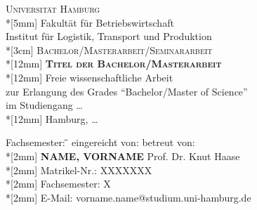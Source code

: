 \documentclass[11pt,a4paper]{article}
\begin{document}
\setcounter{page}{0} %
	\begin{titlepage}
		\begin{center}
			{\LARGE\scshape Universität Hamburg}\\*[5mm]
      		{\normalsize Fakultät für Betriebswirtschaft\\
			Institut für Logistik, Transport und Produktion}\\*[3cm]
      		{\Large\scshape Bachelor/Masterarbeit/Seminararbeit}\\*[12mm]
      		{\bfseries\Large\scshape Titel der Bachelor/Masterarbeit}\\*[12mm] %
      		{\rmfamily Freie wissenschaftliche Arbeit\\
           	zur Erlangung des Grades "`Bachelor/Master of Science"'\\
           	im Studiengang \ldots} \\*[12mm]
      		{\normalsize\rmfamily Hamburg, \ldots} %
		\end{center}
		\vspace{8cm}
		\begin{tabbing}
			Fachsemester: \= \hspace{70mm}\= \kill
 			eingereicht von: \>\> betreut von: \\*[2mm]
      		\textbf{NAME, VORNAME} \>\>  Prof. Dr. Knut Haase\\*[2mm] %
      		Matrikel-Nr.: \> XXXXXXX \>  \\*[2mm] %
      		Fachsemester: \> X \\*[2mm] %
      		E-Mail: vorname.name@studium.uni-hamburg.de %
		\end{tabbing}
  \end{titlepage}

\newpage
{}
\tableofcontents

\newpage
{}
\listoffigures

\newpage
{}
\listoftables

\newpage
{}
\end{document}
